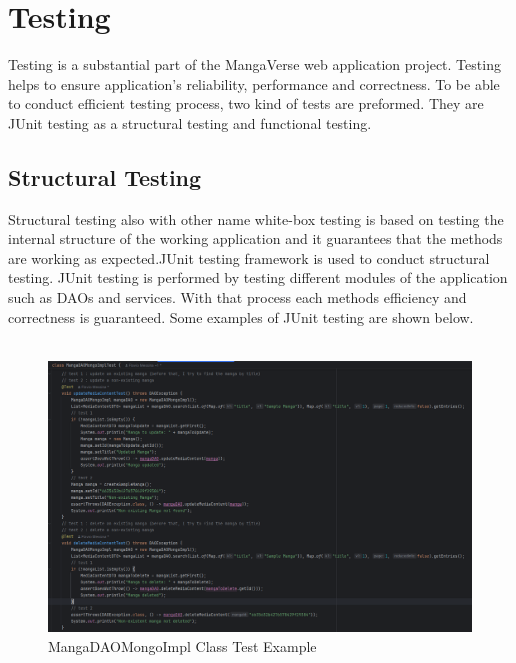 \chapter{Testing}
Testing is a substantial part of the MangaVerse web application project. Testing helps to ensure application's 
reliability, performance and correctness. To be able to conduct efficient testing process, two kind of tests are preformed.
They are JUnit testing as a structural testing and functional testing.

\section{Structural Testing}
Structural testing also with other name white-box testing is based on testing the internal structure of the working application and it 
guarantees that the methods are working as expected.JUnit testing framework is used to conduct structural testing. JUnit testing is performed by testing 
different modules of the application such as DAOs and services. With that process each methods efficiency and correctness is guaranteed. 
Some examples of JUnit testing are shown below.\\ \\

\begin{figure}[h]
    \centering
    \includegraphics[width=\linewidth]{Media/test_example_1.png}
    \caption{MangaDAOMongoImpl Class Test Example}
    \label{MangaDAOMongoImpl Class Test Example}
\end{figure}

